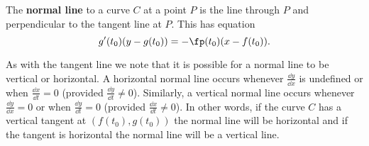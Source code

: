 \begin{definition}\label{def:normal_par}%
The \textbf{normal line} to a curve $C$ at a point $P$ is the line through $P$ and perpendicular to the tangent line at $P$. This has equation
\[g'(t_0)(y-g(t_0))=-\fp(t_0)(x-f(t_0)).\]
\end{definition}

As with the tangent line we note that it is possible for a normal line to be vertical or horizontal. A horizontal normal line occurs whenever $\frac{\dd y}{\dd x}$ is undefined or when $\frac{\dd x}{\dd t} = 0$ (provided $\frac{\dd y}{\dd t} \neq 0$). Similarly, a vertical normal line occurs whenever $\frac{\dd y}{\dd x} = 0$ or when $\frac{\dd y}{\dd t} = 0$ (provided $\frac{\dd x}{\dd t} \neq 0$). In other words, if the curve $C$ has a vertical tangent  at $(f(t_0), g(t_0))$ the normal line will be horizontal and if the tangent is horizontal the normal line will be a vertical line.


